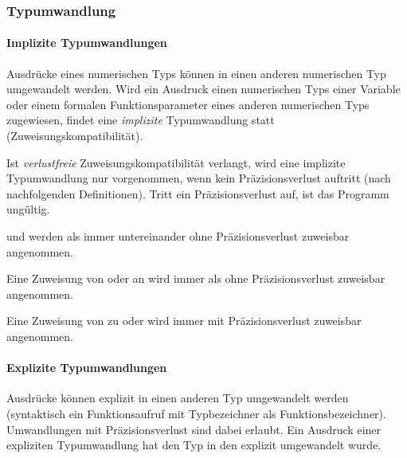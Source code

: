 \subsubsection{Typumwandlung}\label{Typumwandlung}

\paragraph{{Implizite Typumwandlungen}}\label{__Implizite Typumwandlungen__}
Ausdrücke eines numerischen Typs können in einen anderen numerischen Typ umgewandelt werden.
Wird ein Ausdruck einen numerischen Typs einer Variable oder einem formalen Funktionsparameter
eines anderen numerischen Typs zugewiesen, findet eine \emph{implizite} Typumwandlung statt
(Zuweisungskompatibilität).

Ist \emph{verlustfreie} Zuweisungskompatibilität verlangt, wird eine implizite Typumwandlung nur
vorgenommen, wenn kein Präzisionsverlust auftritt (nach nachfolgenden Definitionen). Tritt ein
Präzisionsverlust auf, ist das Programm ungültig.

 und  werden als immer untereinander ohne Präzisionsverlust zuweisbar
angenommen.

Eine Zuweisung von  oder  an  wird immer als ohne Präzisionsverlust zuweisbar
angenommen.

Eine Zuweisung von  zu  oder  wird immer mit Präzisionsverlust zuweisbar angenommen.

\paragraph{{Explizite Typumwandlungen}}\label{__Explizite Typumwandlungen__}
Ausdrücke können explizit in einen anderen Typ umgewandelt werden (syntaktisch ein Funktionsaufruf mit
Typbezeichner als Funktionsbezeichner). Umwandlungen mit Präzisionsverlust sind dabei erlaubt.
Ein Ausdruck einer expliziten Typumwandlung hat den Typ in den explizit umgewandelt wurde.


